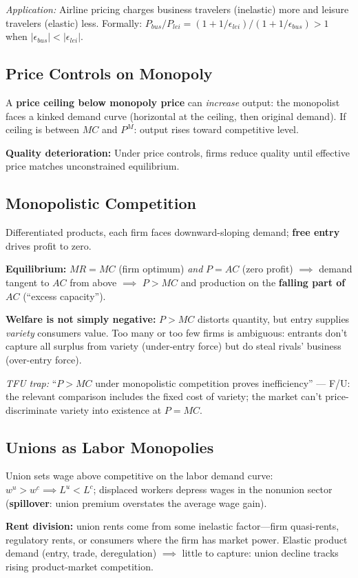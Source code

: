 \textit{Application:} Airline pricing charges business travelers (inelastic) more and leisure travelers (elastic) less. Formally: $P_{bus}/P_{lei} = (1+1/\epsilon_{lei})/(1+1/\epsilon_{bus}) > 1$ when $|\epsilon_{bus}| < |\epsilon_{lei}|$.

\subsection{Price Controls on Monopoly}
A \textbf{price ceiling below monopoly price} can \textit{increase} output: the monopolist faces a kinked demand curve (horizontal at the ceiling, then original demand). If ceiling is between $MC$ and $P^M$: output rises toward competitive level.

\textbf{Quality deterioration:} Under price controls, firms reduce quality until effective price matches unconstrained equilibrium.

\subsection{Monopolistic Competition}
Differentiated products, each firm faces downward-sloping demand; \textbf{free entry} drives profit to zero.

\textbf{Equilibrium:} $MR = MC$ (firm optimum) \textit{and} $P = AC$ (zero profit) $\implies$ demand tangent to $AC$ from above $\implies$ $P > MC$ and production on the \textbf{falling part of $AC$} (``excess capacity'').

\textbf{Welfare is not simply negative:} $P > MC$ distorts quantity, but entry supplies \textit{variety} consumers value. Too many or too few firms is ambiguous: entrants don't capture all surplus from variety (under-entry force) but do steal rivals' business (over-entry force).

\textit{TFU trap:} ``$P > MC$ under monopolistic competition proves inefficiency'' --- F/U: the relevant comparison includes the fixed cost of variety; the market can't price-discriminate variety into existence at $P = MC$.

\subsection{Unions as Labor Monopolies}
Union sets wage above competitive on the labor demand curve: $w^u > w^c \implies L^u < L^c$; displaced workers depress wages in the nonunion sector (\textbf{spillover}: union premium overstates the average wage gain).

\textbf{Rent division:} union rents come from some inelastic factor---firm quasi-rents, regulatory rents, or consumers where the firm has market power. Elastic product demand (entry, trade, deregulation) $\implies$ little to capture: union decline tracks rising product-market competition.

